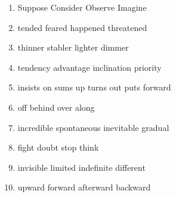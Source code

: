 \begin{enumerate}
	\item

\fourchoices
{Suppose}
{Consider}
{Observe}
{Imagine}




\item


\fourchoices
{tended}
{feared}
{happened}
{threatened}




\item


\fourchoices
{thinner}
{stabler}
{lighter}
{dimmer}




\item

\fourchoices
{tendency}
{advantage}
{inclination}
{priority}




\item


\fourchoices
{insists on}
{sums up}
{turns out}
{puts forward}





\item


\fourchoices
{off}
{behind}
{over}
{along}




\item

\fourchoices
{incredible}
{spontaneous}
{inevitable}
{gradual}


\item


\fourchoices
{fight}
{doubt}
{stop}
{think}




\item


\fourchoices
{invisible}
{limited}
{indefinite}
{different}




\item


\fourchoices
{upward}
{forward}
{afterward}
{backward}





\end{enumerate}
